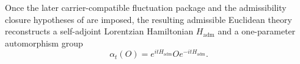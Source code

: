 \begin{corollary}
Once the later carrier-compatible fluctuation package and the admissibility closure hypotheses of  are imposed, the resulting admissible Euclidean theory reconstructs a self-adjoint Lorentzian Hamiltonian $H_{\mathrm{adm}}$ and a one-parameter automorphism group
\[
\alpha_t(O)=e^{itH_{\mathrm{adm}}}Oe^{-itH_{\mathrm{adm}}}.
\]
\end{corollary}

